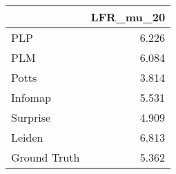 \begin{tabular}{lr}
\toprule
{} & LFR_mu_20 \\
\midrule
PLP          &     6.226 \\
PLM          &     6.084 \\
Potts        &     3.814 \\
Infomap      &     5.531 \\
Surprise     &     4.909 \\
Leiden       &     6.813 \\
Ground Truth &     5.362 \\
\bottomrule
\end{tabular}
